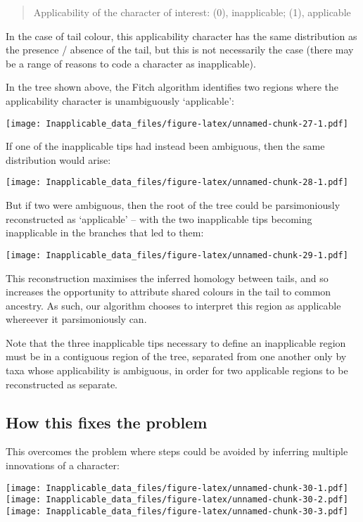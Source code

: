 \documentclass[]{book}
\theoremstyle{definition}
\theoremstyle{definition}
\theoremstyle{definition}
\theoremstyle{remark}
\begin{document}
\begin{quote}
Applicability of the character of interest: (0), inapplicable; (1),
applicable
\end{quote}

In the case of tail colour, this applicability character has the same
distribution as the presence / absence of the tail, but this is not
necessarily the case (there may be a range of reasons to code a
character as inapplicable).

In the tree shown above, the Fitch algorithm identifies two regions
where the applicability character is unambiguously `applicable':

\texttt{[image: Inapplicable\_data\_files/figure-latex/unnamed-chunk-27-1.pdf]}

If one of the inapplicable tips had instead been ambiguous, then the
same distribution would arise:

\texttt{[image: Inapplicable\_data\_files/figure-latex/unnamed-chunk-28-1.pdf]}

But if two were ambiguous, then the root of the tree could be
parsimoniously reconstructed as `applicable' -- with the two
inapplicable tips becoming inapplicable in the branches that led to
them:

\texttt{[image: Inapplicable\_data\_files/figure-latex/unnamed-chunk-29-1.pdf]}

This reconstruction maximises the inferred homology between tails, and
so increases the opportunity to attribute shared colours in the tail to
common ancestry. As such, our algorithm chooses to interpret this region
as applicable whereever it parsimoniously can.

Note that the three inapplicable tips necessary to define an
inapplicable region must be in a contiguous region of the tree,
separated from one another only by taxa whose applicability is
ambiguous, in order for two applicable regions to be reconstructed as
separate.

\subsection{How this fixes the
problem}\label{how-this-fixes-the-problem}

This overcomes the problem where steps could be avoided by inferring
multiple innovations of a character:

\texttt{[image: Inapplicable\_data\_files/figure-latex/unnamed-chunk-30-1.pdf]}
\texttt{[image: Inapplicable\_data\_files/figure-latex/unnamed-chunk-30-2.pdf]}
\texttt{[image: Inapplicable\_data\_files/figure-latex/unnamed-chunk-30-3.pdf]}
\end{document}
